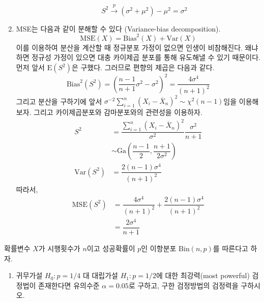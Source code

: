 \documentclass[answers]{exam}
\begin{document}
\begin{questions}
\begin{solution}
\begin{enumerate}
\begin{itemize}
      \begin{equation}
        S^{2} \xrightarrow{p} \left(\sigma^{2}+\mu^{2}\right) - \mu^{2} = \sigma^{2}
      \end{equation}
      \end{itemize}
      \item MSE는 다음과 같이 분해할 수 있다 (Variance-bias decomposition).
      \begin{equation}
        \mathrm{MSE}\left(X\right) = \mathrm{Bias}^{2}\left(X\right) + \mathrm{Var}\left(X\right)
      \end{equation}
      이를 이용하여 분산을 계산할 때 정규분포 가정이 없으면 인생이 비참해진다. 왜냐하면 정규성 가정이 있으면 대충 카이제곱 분포를 통해 유도해낼 수 있기 때문이다. 먼저 앞서 $\mathrm{E}\left(S^{2}\right)$은 구했다. 그러므로 편향의 제곱은 다음과 같다.
      \begin{equation}
        \mathrm{Bias}^{2}\left(S^{2}\right) = \left(\dfrac{n-1}{n+1}\sigma^{2}-\sigma^{2}\right)^{2}=\dfrac{4\sigma^{4}}{\left(n+1\right)^{2}}
      \end{equation}
      그리고 분산을 구하기에 앞서 $\sigma^{-2}\sum_{i=1}^{n}\left(X_{i}-\overline{X}_{n}\right)^{2}\sim \chi^{2}\left(n-1\right)$임을 이용해보자. 그리고 카이제곱분포와 감마분포와의 관련성을 이용하자.
      \begin{align}
        S^{2} &= \dfrac{\sum_{i=1}^{n}\left(X_{i}-\overline{X}_{n}\right)^{2}}{\sigma^{2}}\dfrac{\sigma^{2}}{n+1}\\
        &\sim \mathrm{Ga}\left(\dfrac{n-1}{2},\dfrac{n+1}{2\sigma^{2}}\right)\\
        \mathrm{Var}\left(S^{2}\right) &= \dfrac{2\left(n-1\right)\sigma^{4}}{\left(n+1\right)^{2}}
      \end{align}
      따라서,
      \begin{align}
        \mathrm{MSE}\left(S^{2}\right) &= \dfrac{4\sigma^{4}}{\left(n+1\right)^{2}}+\dfrac{2\left(n-1\right)\sigma^{4}}{\left(n+1\right)^{2}}\\
        &= \dfrac{2\sigma^{4}}{n+1}
      \end{align}
    \end{enumerate}
   \end{solution}
   \question
   확률변수 $X$가 시행횟수가 $n$이고 성공확률이 $p$인 이항분포 $\mathrm{Bin}\left(n,p\right)$를 따른다고 하자.
   \begin{enumerate}
    \item 귀무가설 $H_{0}:p=1/4$ 대 대립가설 $H_{1}:p=1/2$에 대한 최강력(most powerful) 검정법이 존재한다면 유의수준 $\alpha=0.05$로 구하고, 구한 검정방법의 검정력을 구하시오.

\end{enumerate}
\end{questions}
\end{document}
